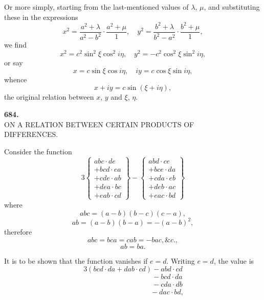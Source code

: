 \documentclass[11pt,a4paper]{article}
\begin{document}
\medskip

Or more simply, starting from the last-mentioned values of $\lambda$, $\mu$, and substituting these in the expressions
\[
x^{2} = \frac{a^{2} + \lambda}{a^{2} - b^{2}}\cdot\frac{a^{2} + \mu}{1},\quad y^{2} = \frac{b^{2} + \lambda}{b^{2} - a^{2}}\cdot\frac{b^{2} + \mu}{1},
\]
we find
\[
x^{2} = c^{2}\sin^{2}\xi\cos^{2}i\eta,\quad y^{2} = -c^{2}\cos^{2}\xi\sin^{2}i\eta,
\]
or say
\[
x = c\sin\xi\cos i\eta,\quad iy = c\cos\xi\sin i\eta,
\]
whence
\[
x + iy = c\sin(\xi + i\eta),
\]
the original relation between $x$, $y$ and $\xi$, $\eta$.

\newpage



\begin{center}
\textbf{684.}\\[6pt]
\large ON A RELATION BETWEEN CERTAIN PRODUCTS OF\\ DIFFERENCES.
\end{center}

\medskip


\medskip

\noindent Consider the function
\[
3\left\{
\begin{array}{l}
abc\cdot de\\
+ bcd\cdot ea\\
+ cde\cdot ab\\
+ dea\cdot bc\\
+ eab\cdot cd
\end{array}
\right\}
-
\left\{
\begin{array}{l}
abd\cdot ce\\
+ bce\cdot da\\
+ cda\cdot eb\\
+ deb\cdot ac\\
+ eac\cdot bd
\end{array}
\right\}
\]
where
\[
abc = (a - b)(b - c)(c - a),
\]
\[
ab = (a - b)(b - a) = -(a - b)^{2},
\]
therefore
\[
abc = bca = cab = -bac, \&c.,
\]
\[
ab = ba.
\]

It is to be shown that the function vanishes if $e = d$. Writing $e = d$, the value is
\[
3(bcd\cdot da + dab\cdot cd) - abd\cdot cd
\]
\[
\phantom{3(bcd\cdot da + dab\cdot cd)} - bcd\cdot da
\]
\[
\phantom{3(bcd\cdot da + dab\cdot cd)} - cda\cdot db
\]
\[
\phantom{3(bcd\cdot da + dab\cdot cd)} - dac\cdot bd,
\]
\end{document}

